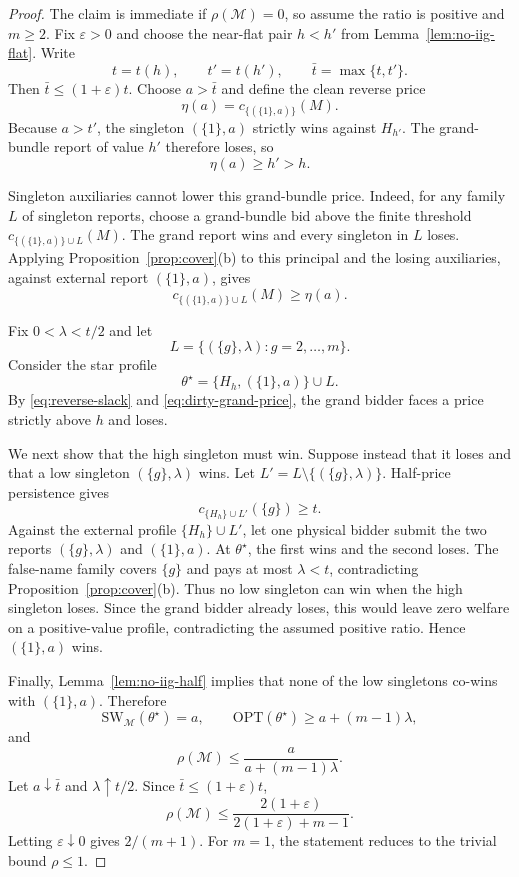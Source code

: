 \documentclass[format=acmsmall, review=false]{acmart}
\newcommand{\OPT}{\mathrm{OPT}}
\newcommand{\SW}{\mathrm{SW}}
\newcommand{\eps}{\varepsilon}
\theoremstyle{acmdefinition}%
\begin{document}
\begin{proof}
The claim is immediate if $\rho(\mathcal M)=0$, so assume the ratio is
positive and $m\ge2$.  Fix $\eps>0$ and choose the near-flat pair $h<h'$ from
Lemma~\ref{lem:no-iig-flat}.  Write
\[
  t=t(h),
  \qquad
  t'=t(h'),
  \qquad
  \bar t=\max\{t,t'\}.
\]
Then $\bar t\le(1+\eps)t$.  Choose $a>\bar t$ and define the clean reverse
price
\[
  \eta(a)=c_{\{(\{1\},a)\}}(M).
\]
Because $a>t'$, the singleton $(\{1\},a)$ strictly wins against $H_{h'}$.
The grand-bundle report of value $h'$ therefore loses, so
\begin{equation}
  \eta(a)\ge h'>h.
  \label{eq:reverse-slack}
\end{equation}

Singleton auxiliaries cannot lower this grand-bundle price.  Indeed, for any
family $L$ of singleton reports, choose a grand-bundle bid above the finite
threshold $c_{\{(\{1\},a)\}\cup L}(M)$.  The grand report wins and every
singleton in $L$ loses.  Applying Proposition~\ref{prop:cover}(b) to this principal
and the losing auxiliaries, against external report $(\{1\},a)$, gives
\begin{equation}
  c_{\{(\{1\},a)\}\cup L}(M)\ge\eta(a).
  \label{eq:dirty-grand-price}
\end{equation}

Fix $0<\lambda<t/2$ and let
\[
  L=\{(\{g\},\lambda):g=2,\ldots,m\}.
\]
Consider the star profile
\begin{equation}
  \theta^\star=\{H_h,(\{1\},a)\}\cup L.
  \label{eq:no-iig-star}
\end{equation}
By \eqref{eq:reverse-slack} and \eqref{eq:dirty-grand-price}, the grand bidder
faces a price strictly above $h$ and loses.

We next show that the high singleton must win.  Suppose instead that it loses
and that a low singleton $(\{g\},\lambda)$ wins.  Let
$L'=L\setminus\{(\{g\},\lambda)\}$.  Half-price persistence gives
\[
  c_{\{H_h\}\cup L'}(\{g\})\ge t.
\]
Against the external profile $\{H_h\}\cup L'$, let one physical bidder submit
the two reports $(\{g\},\lambda)$ and $(\{1\},a)$.  At $\theta^\star$, the
first wins and the second loses.  The false-name family covers $\{g\}$ and
pays at most $\lambda<t$,
contradicting Proposition~\ref{prop:cover}(b).  Thus no low singleton can win when
the high singleton loses.  Since the grand bidder already loses, this would
leave zero welfare on a positive-value profile, contradicting the assumed
positive ratio.  Hence $(\{1\},a)$ wins.

Finally, Lemma~\ref{lem:no-iig-half} implies that none of the low singletons
co-wins with $(\{1\},a)$.  Therefore
\[
  \SW_{\mathcal M}(\theta^\star)=a,
  \qquad
  \OPT(\theta^\star)\ge a+(m-1)\lambda,
\]
and
\[
  \rho(\mathcal M)
  \le\frac{a}{a+(m-1)\lambda}.
\]
Let $a\downarrow\bar t$ and $\lambda\uparrow t/2$.  Since
$\bar t\le(1+\eps)t$,
\[
  \rho(\mathcal M)
  \le
  \frac{2(1+\eps)}{2(1+\eps)+m-1}.
\]
Letting $\eps\downarrow0$ gives $2/(m+1)$.  For $m=1$, the statement reduces
to the trivial bound $\rho\le1$.
\end{proof}
\end{document}
